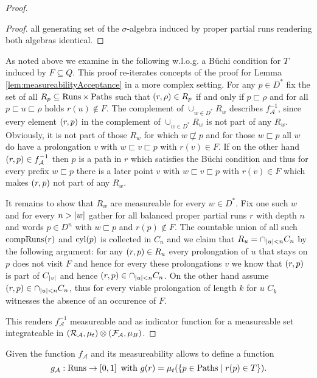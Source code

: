 \begin{proof}
\begin{proof}
    all generating set of the $\sigma$-algebra induced by proper partial runs
    rendering both algebras identical.
  \end{proof}
  As noted above we examine in the following w.l.o.g. a Büchi condition for $T$
  induced by $F\subseteq Q$. This proof re-iterates concepts of the proof for
  Lemma \ref{lem:measureabilityAcceptance} in a more complex setting. For any
  $p\in D^{*}$ fix the set of all $R_{p}\subseteq\operatorname{Runs}\times\operatorname{Paths}$ such that
  $\left(r,\rho\right)\in R_{p}$ if and only if $p\sqsubset\rho$ and for all
  $p\sqsubset u\sqsubset\rho$ holds $r(u)\notin F$. The complement of
  $\cup_{w\in D^{*}}R_{w}$ describes $f_{\mathcal{A}}^{-1}$, since every
  element $\left(r,p\right)$ in the complement of $\cup_{w\in D^{*}}R_{w}$ is not
  part of any $R_{w}$. Obviously, it is not part of those $R_{w}$ for which
  $w\not\sqsubset p$ and for those $w\sqsubset p$ all $w$ do have a prolongation
  $v$ with $w\sqsubset v\sqsubset p$ with $r(v)\in F$. If on the other hand
  $\left(r,p\right)\in f_{\mathcal{A}}^{-1}$ then $p$ is a path in $r$ which
  satisfies the Büchi condition and thus for every prefix $w\sqsubset p$ there
  is a later point $v$ with $w\sqsubset v\sqsubset p$ with $r(v)\in F$ which
  makes $\left(r,p\right)$ not part of any $R_{w}$.

  It remains to show that $R_{w}$ are measureable for every $w\in D^{*}$. Fix
  one such $w$ and for every $n>\left\vert{w}\right\vert$ gather for all balanced proper
  partial runs $r$ with depth $n$ and words $p\in D^{n}$ with $w\sqsubset p$
  and $r(p)\notin F$. The countable union of all such $\operatorname{compRuns}(r)$ and
  $\operatorname{cyl}(p)$ is collected in $C_{n}$ and we claim that
  $R_{u} = \cap_{\left\vert{u}\right\vert<n}C_{n}$ by the following argument: for any
  $\left(r,p\right)\in R_{u}$ every prolongation of $u$ that stays on $p$ does not
  visit $F$ and hence for every these prolongations $v$ we know that
  $\left(r,p\right)$ is part of $C_{\left\vert{v}\right\vert}$ and hence
  $\left(r,p\right)\in\cap_{\left\vert{u}\right\vert<n}C_{n}$. On the other hand assume
  $\left(r,p\right)\in\cap_{\left\vert{u}\right\vert<n}C_{n}$, thus for every viable prolongation
  of length $k$ for $u$ $C_{k}$ witnesses the absence of an occurence of $F$.
  
  This renders $f_{\mathcal{A}}^{-1}$ measureable and as indicator function for
  a measureable set integrateable in
  $\left(\mathcal{R}_{\mathcal{A}},\mu_{t}\right)\otimes
  \left(\mathcal{F}_{\mathcal{A}},\mu_{B}\right)$.
\end{proof}
Given the function $f_{\mathcal{A}}$ and its measureability allows to define
a function
\begin{equation*}
  g_{\mathcal{A}}:\operatorname{Runs}\rightarrow\left[0,1\right]
  \text{ with }
  g(r) = \mu_{t}(\left\{p\in\operatorname{Paths}\mid r(p)\in T\right\}).
\end{equation*}
